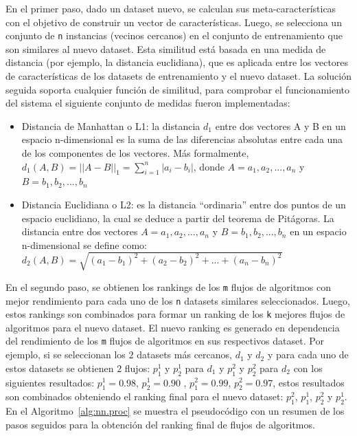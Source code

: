 En el primer paso, dado un dataset nuevo, se calculan sus meta-características con el objetivo de construir un vector de características. Luego, se selecciona un conjunto de \texttt{n} instancias (vecinos cercanos) en el conjunto de entrenamiento que son similares al nuevo dataset. Esta similitud está basada en una medida de distancia (por ejemplo, la distancia euclidiana), que es aplicada entre los vectores de características de los datasets de entrenamiento y el nuevo dataset. La solución seguida soporta cualquier función de similitud, para comprobar el funcionamiento del sistema el siguiente conjunto de medidas fueron implementadas:

\begin{itemize}
	\item Distancia de Manhattan o L1: la distancia $d_1$ entre dos vectores A y B en un espacio n-dimensional es la suma de las diferencias absolutas entre cada una de los componentes de los vectores. Más formalmente, $d_1(A, B) = {||A - B||}_1 = \sum^n_{i=1} |a_i - b_i|$, donde $A = a_1, a_2, ..., a_n$ y $B = b_1, b_2, ..., b_n$
	\item Distancia Euclidiana o L2: es la distancia ``ordinaria'' entre dos puntos de un espacio euclidiano, la cual se deduce a partir del teorema de Pitágoras. La distancia entre dos vectores $A = a_1, a_2, ..., a_n$ y $B = b_1, b_2, ..., b_n$ en un espacio n-dimensional se define como: $d_2(A, B)=\sqrt{(a_1 - b_1)^2 + (a_2 - b_2)^2 + ... + (a_n - b_n)^2}$
\end{itemize}

En el segundo paso, se obtienen los rankings de los \texttt{m} flujos de algoritmos con mejor rendimiento para cada uno de los \texttt{n} datasets similares seleccionados. Luego, estos rankings son combinados para formar un ranking de los \texttt{k} mejores flujos de algoritmos para el nuevo dataset. El nuevo ranking es generado en dependencia del rendimiento de los \texttt{m} flujos de algoritmos en sus respectivos dataset. Por ejemplo, si se seleccionan los $2$ datasets más cercanos, $d_1$ y $d_2$ y para cada uno de estos datasets se obtienen $2$ flujos: $p^1_1$ y $p^1_2$ para $d_1$ y $p^2_1$ y $p^2_2$ para $d_2$ con los siguientes resultados: $p^1_1 = 0.98$, $p^1_2 = 0.90$ , $p^2_1 = 0.99$, $p^2_2 = 0.97$, estos resultados son combinados obteniendo el ranking final para el nuevo dataset: $p^2_1$, $p^1_1$, $p^2_2$ y $p^1_2$. En el Algoritmo~\ref{alg:nn.proc} se muestra el pseudocódigo con un resumen de los pasos seguidos para la obtención del ranking final de flujos de algoritmos.

